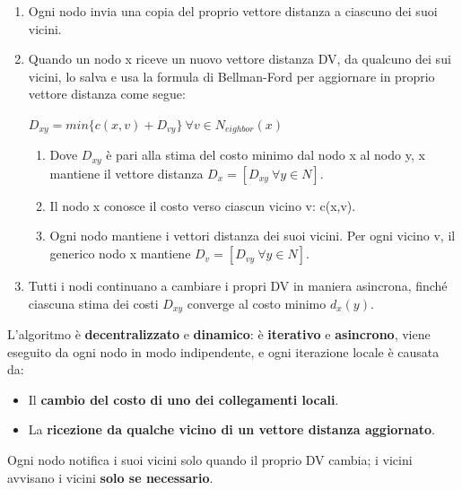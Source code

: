 \documentclass[11pt,a4paper,oneside]{book}
\theoremstyle{definition}
\begin{document}
\begin{enumerate}
	\item Ogni nodo invia una copia del proprio vettore distanza
	      a ciascuno dei suoi vicini.
	\item Quando un nodo x riceve un nuovo vettore distanza DV, da qualcuno dei sui vicini, lo salva e usa la formula di Bellman-Ford per aggiornare in proprio vettore distanza come segue:
	      \begin{center}
		      $\displaystyle D_{xy} = min \{c(x,v) + D_{vy}\} \ \forall v \in N_{eighbor}(x)$
	      \end{center}
	      \begin{enumerate}
		      \item Dove $D_{xy}$ è pari alla stima del costo minimo dal nodo x al nodo y, x mantiene il vettore distanza $D_{x} = [D_{xy} \ \forall y \in N]$.
		      \item Il nodo x conosce il costo verso ciascun vicino v: c(x,v).
		      \item Ogni nodo mantiene i vettori distanza dei suoi vicini. Per ogni
		            vicino v, il generico nodo x mantiene $D_{v} = [D_{vy}  \ \forall y \in N ]$.
	      \end{enumerate}
	\item Tutti i nodi continuano a cambiare i propri DV in
	      maniera asincrona, finché ciascuna stima dei costi $D_{xy}$ converge al costo minimo $d_{x}(y)$.
\end{enumerate}
L'algoritmo è \textbf{decentralizzato} e \textbf{dinamico}: è \textbf{iterativo} e \textbf{asincrono}, viene eseguito da ogni nodo in modo indipendente, e ogni iterazione locale è causata da:

\begin{itemize}
	\item Il \textbf{cambio del costo di uno dei collegamenti locali}.
	\item La \textbf{ricezione da qualche vicino di un vettore distanza aggiornato}.
\end{itemize}

Ogni nodo notifica i suoi vicini solo quando il proprio DV cambia; i vicini avvisano i vicini \textbf{solo se necessario}.
\end{document}
